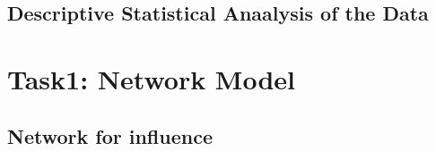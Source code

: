 \documentclass[12pt]{article}  %
\begin{document}
\subsection{Descriptive Statistical Anaalysis of the Data}






























\section{Task1: Network Model}%
\subsection{Network for influence}








\end{document}
